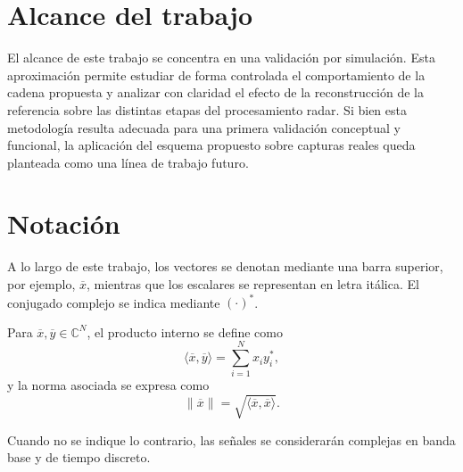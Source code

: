 \section{Alcance del trabajo}

El alcance de este trabajo se concentra en una validación por simulación. Esta aproximación permite estudiar de forma controlada el comportamiento de la cadena propuesta y analizar con claridad el efecto de la reconstrucción de la referencia sobre las distintas etapas del procesamiento radar. Si bien esta metodología resulta adecuada para una primera validación conceptual y funcional, la aplicación del esquema propuesto sobre capturas reales queda planteada como una línea de trabajo futuro.


\section{Notación}

A lo largo de este trabajo, los vectores se denotan mediante una barra superior, por ejemplo, \(\overline{x}\), mientras que los escalares se representan en letra itálica. El conjugado complejo se indica mediante \((\cdot)^*\).

Para \(\overline{x}, \overline{y} \in \mathbb{C}^N\), el producto interno se define como
\[
\langle \overline{x}, \overline{y} \rangle
=
\sum_{i=1}^{N} x_i y_i^*,
\]
y la norma asociada se expresa como
\[
\|\overline{x}\| = \sqrt{\langle \overline{x}, \overline{x} \rangle}.
\]

Cuando no se indique lo contrario, las señales se considerarán complejas en banda base y de tiempo discreto.
